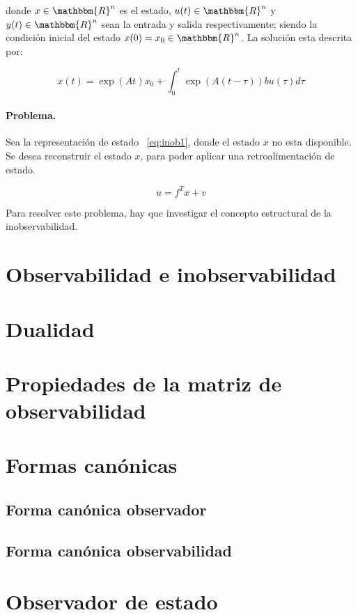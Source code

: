 	donde $x \in \mathbbm{R}^n$ es el estado, $u(t) \in \mathbbm{R}^n$ y $y(t) \in \mathbbm{R}^n$ sean la entrada y salida respectivamente; siendo la condición inicial del estado $x(0) = x_0 \in \mathbbm{R}^n$. La solución esta descrita por:

	\begin{equation*}
		x(t) = \exp{(At)} x_0 + \int_0^t \exp{\left(A(t - \tau)\right)} b u(\tau) d\tau
	\end{equation*}

	\paragraph{Problema.}

	Sea la representación de estado ~\ref{eq:inob1}, donde el estado $x$ no esta disponible. Se desea reconstruir el estado $x$, para poder aplicar una retroalimentación de estado.

	\begin{equation}
		u = f^T x + v
	\end{equation}

	Para resolver este problema, hay que investigar el concepto estructural de la inobservabilidad.

	\newpage
    \section{Observabilidad e inobservabilidad}

    \newpage
    \section{Dualidad}

    \newpage
    \section{Propiedades de la matriz de observabilidad}

    \newpage
    \section{Formas canónicas}
        \subsection{Forma canónica observador}
        \subsection{Forma canónica observabilidad}

    \newpage
    \section{Observador de estado}
